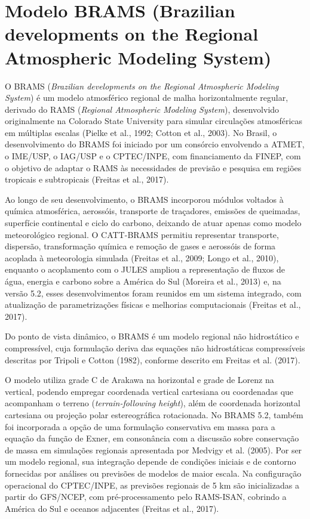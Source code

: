 \documentclass[12pt,a4paper,oneside]{book}
\begin{document}
\section{Modelo BRAMS (Brazilian developments on the Regional Atmospheric Modeling System)}

O BRAMS (\emph{Brazilian developments on the Regional Atmospheric Modeling System}) é um modelo atmosférico regional de malha horizontalmente regular, derivado do RAMS (\emph{Regional Atmospheric Modeling System}), desenvolvido originalmente na Colorado State University para simular circulações atmosféricas em múltiplas escalas (Pielke et al., 1992; Cotton et al., 2003). No Brasil, o desenvolvimento do BRAMS foi iniciado por um consórcio envolvendo a ATMET, o IME/USP, o IAG/USP e o CPTEC/INPE, com financiamento da FINEP, com o objetivo de adaptar o RAMS às necessidades de previsão e pesquisa em regiões tropicais e subtropicais (Freitas et al., 2017).

Ao longo de seu desenvolvimento, o BRAMS incorporou módulos voltados à química atmosférica, aerossóis, transporte de traçadores, emissões de queimadas, superfície continental e ciclo do carbono, deixando de atuar apenas como modelo meteorológico regional. O CATT-BRAMS permitiu representar transporte, dispersão, transformação química e remoção de gases e aerossóis de forma acoplada à meteorologia simulada (Freitas et al., 2009; Longo et al., 2010), enquanto o acoplamento com o JULES ampliou a representação de fluxos de água, energia e carbono sobre a América do Sul (Moreira et al., 2013) e, na versão 5.2, esses desenvolvimentos foram reunidos em um sistema integrado, com atualização de parametrizações físicas e melhorias computacionais (Freitas et al., 2017).

Do ponto de vista dinâmico, o BRAMS é um modelo regional não hidrostático e compressível, cuja formulação deriva das equações não hidrostáticas compressíveis descritas por Tripoli e Cotton (1982), conforme descrito em Freitas et al. (2017).

O modelo utiliza grade C de Arakawa na horizontal e grade de Lorenz na vertical, podendo empregar coordenada vertical cartesiana ou coordenadas que acompanham o terreno (\emph{terrain-following height}), além de coordenada horizontal cartesiana ou projeção polar estereográfica rotacionada. No BRAMS 5.2, também foi incorporada a opção de uma formulação conservativa em massa para a equação da função de Exner, em consonância com a discussão sobre conservação de massa em simulações regionais apresentada por Medvigy et al. (2005). Por ser um modelo regional, sua integração depende de condições iniciais e de contorno fornecidas por análises ou previsões de modelos de maior escala. Na configuração operacional do CPTEC/INPE, as previsões regionais de 5 km são inicializadas a partir do GFS/NCEP, com pré-processamento pelo RAMS-ISAN, cobrindo a América do Sul e oceanos adjacentes (Freitas et al., 2017).
\end{document}
